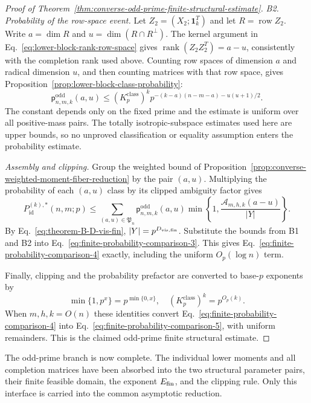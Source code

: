 \documentclass[11pt]{article}
\newcommand{\rank}{\operatorname{rank}}
\newcommand{\1}{\mathbf 1}
\theoremstyle{plain}
\theoremstyle{definition}
\theoremstyle{remark}
\begin{document}
\begin{proof}[Proof of Theorem~\ref{thm:converse-odd-prime-finite-structural-estimate}]
\smallskip
\noindent\emph{B2. Probability of the row-space event.}
Let $Z_2=(X_2;\1_k^T)$ and let $R=\operatorname{row}Z_2$.  Write
$a=\dim R$ and $u=\dim(R\cap R^\perp)$.  The kernel argument in
Eq.~\eqref{eq:lower-block-rank-row-space} gives
$\rank(Z_2Z_2^T)=a-u$, consistently with the completion rank used above.  Counting row spaces of
dimension $a$ and radical dimension $u$, and then counting matrices with that
row space, gives Proposition~\ref{prop:lower-block-class-probability}:
\begin{equation}
 \mathsf p_{n,m,k}^{\mathrm{odd}}(a,u)
 \le
 (K_p^{\mathrm{class}})^k
 p^{-(k-a)(n-m-a)-u(u+1)/2}.
 \label{eq:theorem-B-proof-lower-block-probability}
\end{equation}
The constant depends only on the fixed prime and the estimate is uniform over
all positive-mass pairs.  The totally isotropic-subspace estimates used here
are upper bounds, so no unproved classification or equality assumption enters
the probability estimate.

\smallskip
\noindent\emph{Assembly and clipping.}
Group the weighted bound of
Proposition~\ref{prop:converse-weighted-moment-fiber-reduction} by the pair $(a,u)$.
Multiplying the probability of each $(a,u)$ class by its clipped ambiguity
factor gives
\begin{equation}
 P_{\mathrm{id}}^{(k),*}(n,m;p)
 \le\sum_{(a,u)\in\mathfrak P_n}
 \mathsf p_{n,m,k}^{\mathrm{odd}}(a,u)
 \min\left\{1,
 \frac{\mathcal A_{m,h,k}(a-u)}{\lvert Y\rvert}\right\}.
 \label{eq:finite-probability-comparison-3}
\end{equation}
By Eq.~\eqref{eq:theorem-B-D-vis-fin},
$\lvert Y\rvert=p^{D_{\rm vis,fin}}$.  Substitute the bounds from B1 and B2 into
Eq.~\eqref{eq:finite-probability-comparison-3}.  This gives
Eq.~\eqref{eq:finite-probability-comparison-4} exactly, including the uniform
$O_p(\log n)$ term.

Finally, clipping and the probability prefactor are converted to base-$p$
exponents by
\begin{equation}
 \min\{1,p^x\}=p^{\min\{0,x\}},
 \quad
 (K_p^{\mathrm{class}})^k=p^{O_p(k)}.
 \label{eq:theorem-B-clipping-identities}
\end{equation}
When $m,h,k=O(n)$ these identities convert
Eq.~\eqref{eq:finite-probability-comparison-4} into
Eq.~\eqref{eq:finite-probability-comparison-5}, with uniform remainders.  This is
the claimed odd-prime finite structural estimate.
\end{proof}

The odd-prime branch is now complete.  The individual lower moments and all
completion matrices have been absorbed into the two structural parameter
pairs, their finite feasible domain, the exponent $E_{\rm fin}$, and the
clipping rule.  Only this interface is carried into the common asymptotic
reduction.
\end{document}
